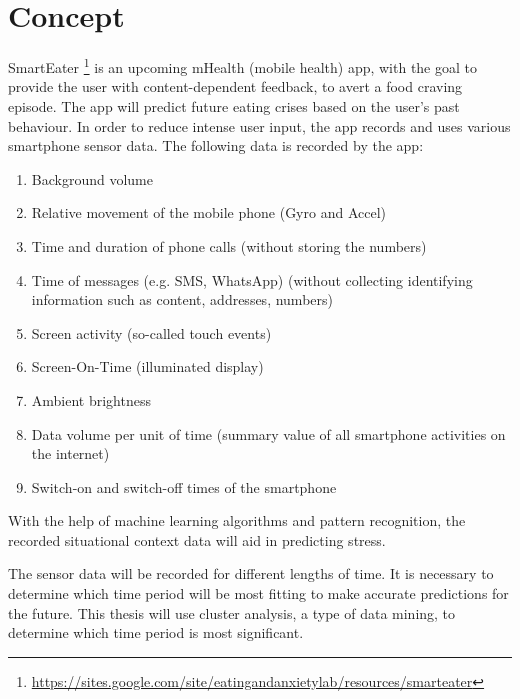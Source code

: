 \documentclass[12pt,a4paper]{article}
\title{\titlename}
\author{ \authorid\\ \scriptsize \address }
\date{\exposedate}
\begin{document}

\maketitle

\section*{Concept}


SmartEater \footnote{\url{https://sites.google.com/site/eatingandanxietylab/resources/smarteater}} is an upcoming mHealth (mobile health) app, with the goal to provide the user with content-dependent feedback, to avert a food craving episode. The app will predict future eating crises based on the user's past behaviour. In order to reduce intense user input, the app records and uses various smartphone sensor data. The following data is recorded by the app:

\begin{enumerate}
	\item Background volume
	\item Relative movement of the mobile phone (Gyro and Accel)
	\item Time and duration of phone calls (without storing the numbers)
	\item Time of messages (e.g. SMS, WhatsApp) (without collecting identifying information such as content, addresses, numbers)
	\item Screen activity (so-called touch events)
	\item Screen-On-Time (illuminated display)
	\item Ambient brightness
	\item Data volume per unit of time (summary value of all smartphone activities on the internet)
	\item Switch-on and switch-off times of the smartphone
\end{enumerate}
 With the help of machine learning algorithms and pattern recognition, the recorded situational context data will aid in predicting stress.


The sensor data will be recorded for different lengths of time. It is necessary to determine which time period will be most fitting to make accurate predictions for the future. This thesis will use cluster analysis, a type of data mining, to determine which time period is most significant.
\end{document}
